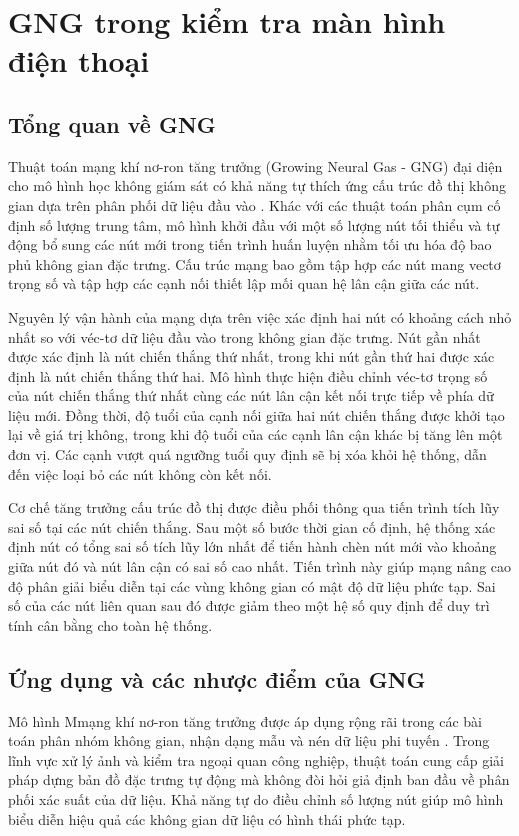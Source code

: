 \section{GNG trong kiểm tra màn hình điện thoại}

\subsection{Tổng quan về GNG}

Thuật toán mạng khí nơ-ron tăng trưởng (Growing Neural Gas - GNG) đại diện cho mô hình học không giám sát có khả năng tự thích ứng cấu trúc đồ thị không gian dựa trên phân phối dữ liệu đầu vào \cite{fritzke1995growing}. Khác với các thuật toán phân cụm cố định số lượng trung tâm, mô hình khởi đầu với một số lượng nút tối thiểu và tự động bổ sung các nút mới trong tiến trình huấn luyện nhằm tối ưu hóa độ bao phủ không gian đặc trưng. Cấu trúc mạng bao gồm tập hợp các nút mang vectơ trọng số và tập hợp các cạnh nối thiết lập mối quan hệ lân cận giữa các nút.

Nguyên lý vận hành của mạng dựa trên việc xác định hai nút có khoảng cách nhỏ nhất so với véc-tơ dữ liệu đầu vào trong không gian đặc trưng. Nút gần nhất được xác định là nút chiến thắng thứ nhất, trong khi nút gần thứ hai được xác định là nút chiến thắng thứ hai. Mô hình thực hiện điều chỉnh véc-tơ trọng số của nút chiến thắng thứ nhất cùng các nút lân cận kết nối trực tiếp về phía dữ liệu mới. Đồng thời, độ tuổi của cạnh nối giữa hai nút chiến thắng được khởi tạo lại về giá trị không, trong khi độ tuổi của các cạnh lân cận khác bị tăng lên một đơn vị. Các cạnh vượt quá ngưỡng tuổi quy định sẽ bị xóa khỏi hệ thống, dẫn đến việc loại bỏ các nút không còn kết nối.

Cơ chế tăng trưởng cấu trúc đồ thị được điều phối thông qua tiến trình tích lũy sai số tại các nút chiến thắng. Sau một số bước thời gian cố định, hệ thống xác định nút có tổng sai số tích lũy lớn nhất để tiến hành chèn nút mới vào khoảng giữa nút đó và nút lân cận có sai số cao nhất. Tiến trình này giúp mạng nâng cao độ phân giải biểu diễn tại các vùng không gian có mật độ dữ liệu phức tạp. Sai số của các nút liên quan sau đó được giảm theo một hệ số quy định để duy trì tính cân bằng cho toàn hệ thống.

\subsection{Ứng dụng và các nhược điểm của GNG}

Mô hình Mmạng khí nơ-ron tăng trưởng được áp dụng rộng rãi trong các bài toán phân nhóm không gian, nhận dạng mẫu và nén dữ liệu phi tuyến \cite{martinetz1993neural, fritzke1995growing}. Trong lĩnh vực xử lý ảnh và kiểm tra ngoại quan công nghiệp, thuật toán cung cấp giải pháp dựng bản đồ đặc trưng tự động mà không đòi hỏi giả định ban đầu về phân phối xác suất của dữ liệu. Khả năng tự do điều chỉnh số lượng nút giúp mô hình biểu diễn hiệu quả các không gian dữ liệu có hình thái phức tạp.

